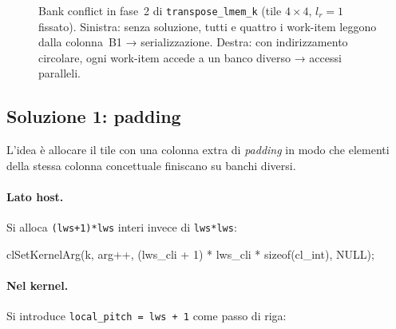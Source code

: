 \begin{figure}[htbp]
{
}
\caption{Bank conflict in fase~2 di \texttt{transpose\_lmem\_k} (tile $4\times4$, $l_r=1$ fissato). Sinistra: senza soluzione, tutti e quattro i work-item leggono dalla colonna~B1 → serializzazione. Destra: con indirizzamento circolare, ogni work-item accede a un banco diverso → accessi paralleli.}
\label{fig:bank_conflict}
\end{figure}

\subsection{Soluzione 1: padding}\label{sec:opencl_lmem_padding}

L'idea è allocare il tile con una colonna extra di \emph{padding} in modo che elementi della stessa colonna concettuale finiscano su banchi diversi.

\paragraph{Lato host.} Si alloca \texttt{(lws+1)*lws} interi invece di \texttt{lws*lws}:

\begin{code}[caption={Allocazione del tile con padding}, label={code:tile_padding_host}]
clSetKernelArg(k, arg++, (lws_cli + 1) * lws_cli * sizeof(cl_int), NULL);
\end{code}

\paragraph{Nel kernel.} Si introduce \texttt{local\_pitch = lws + 1} come passo di riga:

